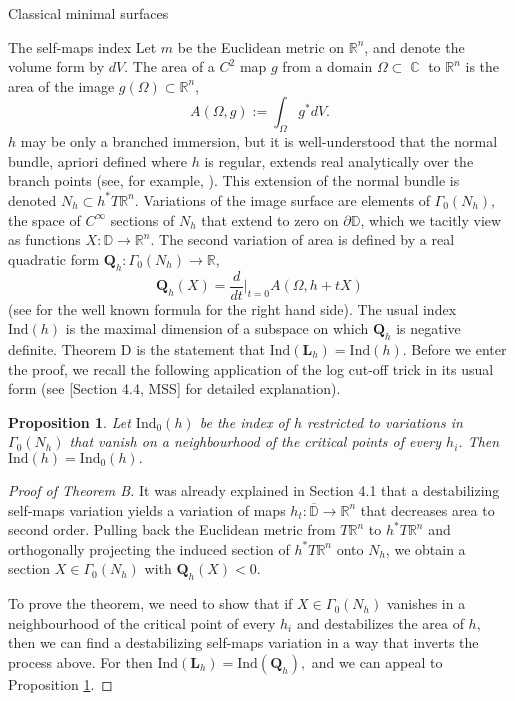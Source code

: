 \documentclass[10pt]{amsart}
\newcommand{\R}{\mathbb R}
\newtheorem{prop}[thm]{Proposition}
\DeclareMathOperator{\C}{\mathbb{C}}
\theoremstyle{definition}
\begin{document}
\begin{section}{Classical minimal surfaces}
\begin{subsection}{The self-maps index}
Let $m$ be the Euclidean metric on $\R^n$, and denote the volume form by $dV$. The area of a $C^2$ map $g$ from a domain $\Omega\subset \C$ to $\R^n$ is the area of the image $g(\Omega)\subset \R^n$, $$A(\Omega,g):=\int_{\Omega} g^*dV.$$ $h$ may be only a branched immersion, but it is well-understood that the normal bundle, apriori defined where $h$ is regular, extends real analytically over the branch points (see, for example, \cite[Lemma 1.3]{GOR}). This extension of the normal bundle is denoted $N_h\subset h^* T\R^n$. Variations of the image surface are elements of $\Gamma_0(N_h),$ the space of $C^\infty$ sections of $N_h$ that extend to zero on $\partial\mathbb{D}$, which we tacitly view as functions $X:\mathbb{D}\to\R^n.$ The second variation of area is defined by a real quadratic form  $\mathbf{Q}_h:\Gamma_0(N_h)\to \R$, $$\mathbf{Q}_h(X) = \frac{d}{dt}|_{t=0} A(\Omega, h+tX)$$ (see \cite[Theorem 32]{Law} for the well known formula for the right hand side).
The usual index $\textrm{Ind}(h)$ is the maximal dimension of a subspace on which $\mathbf{Q}_h$ is negative definite. Theorem D is the statement that $\textrm{Ind}(\mathbf{L}_h)=\textrm{Ind}(h).$ Before we enter the proof, we recall the following application of the log cut-off trick in its usual form (see [Section 4.4, MSS] for detailed explanation).

\begin{prop}\label{cutoffindex}
    Let $\textrm{Ind}_0(h)$ be the index of $h$ restricted to variations in $\Gamma_0(N_h)$ that vanish on a neighbourhood of the critical points of every $h_i$. Then $\textrm{Ind}(h)=\textrm{Ind}_0(h).$
\end{prop}




\begin{proof}[Proof of Theorem B]
It was already explained in Section 4.1 that a destabilizing self-maps variation yields a variation of maps $h_t:\overline{\mathbb{D}}\to \R^n$ that decreases area to second order. Pulling back the Euclidean metric from $T\R^n$ to $h^*T\R^n$ and orthogonally projecting the induced section of $h^*T\R^n$ onto $N_h$, we obtain a section $X\in \Gamma_0(N_h)$ with $\mathbf{Q}_h(X)<0.$ 

To prove the theorem, we need to show that if $X\in \Gamma_0(N_h)$ vanishes in a neighbourhood of the critical point of every $h_i$ and destabilizes the area of $h$, then we can find a destabilizing self-maps variation in a way that inverts the process above. For then $\textrm{Ind}(\mathbf{L}_h)=\textrm{Ind}(\mathbf{Q}_h),$ and we can appeal to Proposition \ref{cutoffindex}.


\end{proof}
\end{subsection}
\end{section}
\end{document}
